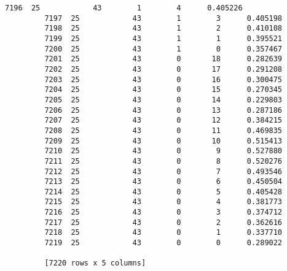 \documentclass[11pt]{article}
\begin{document}
\begin{Verbatim}[commandchars=\\\{\}]
         7196  25            43        1        4      0.405226
         7197  25            43        1        3      0.405198
         7198  25            43        1        2      0.410108
         7199  25            43        1        1      0.395521
         7200  25            43        1        0      0.357467
         7201  25            43        0       18      0.282639
         7202  25            43        0       17      0.291208
         7203  25            43        0       16      0.300475
         7204  25            43        0       15      0.270345
         7205  25            43        0       14      0.229803
         7206  25            43        0       13      0.287186
         7207  25            43        0       12      0.384215
         7208  25            43        0       11      0.469835
         7209  25            43        0       10      0.515413
         7210  25            43        0        9      0.527880
         7211  25            43        0        8      0.520276
         7212  25            43        0        7      0.493546
         7213  25            43        0        6      0.450504
         7214  25            43        0        5      0.405428
         7215  25            43        0        4      0.381773
         7216  25            43        0        3      0.374712
         7217  25            43        0        2      0.362616
         7218  25            43        0        1      0.337710
         7219  25            43        0        0      0.289022
         
         [7220 rows x 5 columns]
\end{Verbatim}
            
\end{document}
